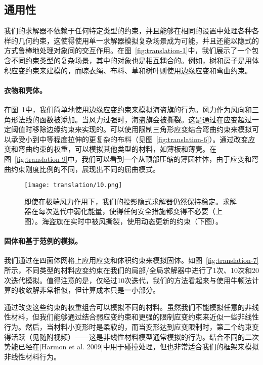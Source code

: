 \begin{translation}
\subsection{通用性}

我们的求解器不依赖于任何特定类型的约束，并且能够在相同的设置中处理各种各样的几何约束，这使得使用单一求解器模拟复杂场景成为可能，并且还能以隐式的方式鲁棒地处理对象间的交互作用。在图~\ref{fig:translation-1}中，我们展示了一个包含不同约束类型的复杂场景，其中的对象也是相互耦合的。例如，树和房子是用体积应变约束来建模的，而晾衣绳、布料、草和树叶则使用边缘应变和弯曲约束。

\paragraph{衣物和壳体。}

在图~\ref{fig:translation-10}中，我们简单地使用边缘应变约束来模拟海盗旗的行为。风力作为风向和三角形法线的函数被添加。当风力过强时，海盗旗会被撕裂。这是通过在应变超过一定阈值时移除边缘约束来实现的。可以使用限制三角形应变结合弯曲约束来模拟可以承受小到中等程度拉伸的更复杂的布料（见图~\ref{fig:translation-6}）。通过改变应变和弯曲约束的权重，可以模拟其他类型的材料，如薄板和薄壳。在图~\ref{fig:translation-9}中，我们可以看到一个从顶部压缩的薄圆柱体，由于应变和弯曲约束刚度比例的不同，展现出不同的屈曲模式。

\begin{figure}
  \centering
  \texttt{[image: translation/10.png]}
  \caption{
    即使在极端风力作用下，我们的投影隐式求解器仍然保持稳定。求解器在每次迭代中弱化能量，使得任何安全措施都变得不必要（上图）。海盗旗在实时中被风撕裂，使用动态更新的约束（下图）。
  }
  \label{fig:translation-10}
\end{figure}

\paragraph{固体和基于范例的模拟。}

我们通过在四面体网格上应用应变和体积约束来模拟固体。如图~\ref{fig:translation-7}所示，不同类型的材料应变约束在我们的局部/全局求解器中进行了1次、10次和20次迭代模拟。值得注意的是，仅经过10次迭代，我们的方法看起来与使用牛顿法计算的收敛解非常相似，但计算成本只是一小部分。

通过改变这些约束的权重组合可以模拟不同的材料。虽然我们不能模拟任意的非线性材料，但我们能够通过结合弱应变约束和更强的限制应变约束来近似一些非线性行为。然后，当材料小变形时是柔软的，而当变形达到应变限制时，第二个约束变得活跃（见随附视频）——这是非线性材料模型通常模拟的行为。结合不同的二次势能已经在[Harmon et al. 2009]中用于碰撞处理，但也非常适合我们的框架来模拟非线性材料行为。


\end{translation}
